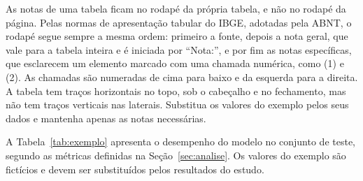 \begin{orientacao}
  As notas de uma tabela ficam no rodapé da própria tabela, e não no rodapé da página. Pelas normas de apresentação tabular do IBGE, adotadas pela ABNT, o rodapé segue sempre a mesma ordem: primeiro a fonte, depois a nota geral, que vale para a tabela inteira e é iniciada por ``Nota:'', e por fim as notas específicas, que esclarecem um elemento marcado com uma chamada numérica, como (1) e (2). As chamadas são numeradas de cima para baixo e da esquerda para a direita. A tabela tem traços horizontais no topo, sob o cabeçalho e no fechamento, mas não tem traços verticais nas laterais. Substitua os valores do exemplo pelos seus dados e mantenha apenas as notas necessárias.
\end{orientacao}

A Tabela~\ref{tab:exemplo} apresenta o desempenho do modelo no conjunto de teste, segundo as métricas definidas na Seção~\ref{sec:analise}. Os valores do exemplo são fictícios e devem ser substituídos pelos resultados do estudo.

